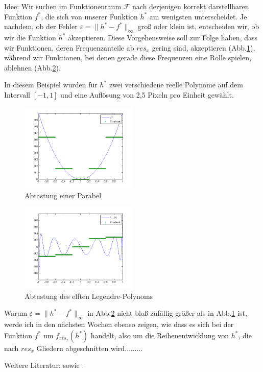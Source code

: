 \documentclass[a4paper]{article}
\begin{document}
Idee: Wir suchen im Funktionenraum $\mathcal{F}$ nach derjenigen korrekt darstellbaren Funktion $f^*$, die sich von unserer Funktion $h^*$ am wenigsten unterscheidet. Je nachdem, ob der Fehler $\varepsilon=\lVert h^*-f^*\rVert_{\infty}$ groß oder klein ist, entscheiden wir, ob wir die Funktion $h^*$ akzeptieren.
Diese Vorgehensweise soll zur Folge haben, dass wir Funktionen, deren Frequenzanteile ab $res_x$ gering sind, akzeptieren (Abb.\ref{Abb.1}), während wir Funktionen, bei denen gerade diese Frequenzen eine Rolle spielen, ablehnen (Abb.\ref{Abb.2}).

In diesem Beispiel wurden für $h^*$ zwei verschiedene reelle Polynome auf dem Intervall $[-1,1]$ und eine Auflösung von 2,5 Pixeln pro Einheit gewählt.

\begin{figure}[ht]
\centering
\includegraphics[width=0.5\textwidth]{../grafiken/parabelplot.png}
\caption{Abtastung einer Parabel}
\label{Abb.1}
\end{figure}
\begin{figure}[ht]
\centering
\includegraphics[width=0.5\textwidth]{../grafiken/legendre11plot.png}
\caption{Abtastung des elften Legendre-Polynoms}
\label{Abb.2}
\end{figure}

Warum $\varepsilon=\lVert h^*-f^*\rVert_{\infty}$ in Abb.\ref{Abb.2} nicht bloß zufällig größer als in Abb.\ref{Abb.1} ist, werde ich in den nächsten Wochen ebenso zeigen, wie dass es sich bei der Funktion $f^*$ um $f_{res_x}(h^*)$ handelt, also um die Reihenentwicklung von $h^*$, die nach $res_x$ Gliedern abgeschnitten wird.........

Weitere Literatur: \cite[]{Achilles1978} sowie \cite[]{Schroeder1978}.



\end{document}
